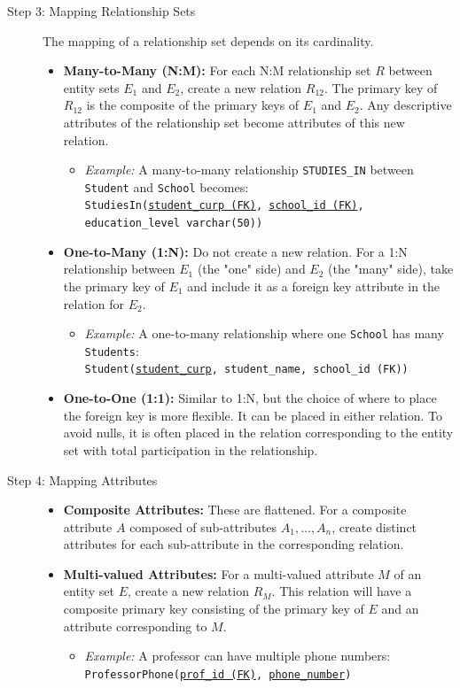 \begin{description}
    \item[Step 3: Mapping Relationship Sets] The mapping of a relationship set depends on its cardinality.
    \begin{itemize}
        \item \textbf{Many-to-Many (N:M):} For each N:M relationship set $R$ between entity sets $E_1$ and $E_2$, create a new relation $R_{12}$. The primary key of $R_{12}$ is the composite of the primary keys of $E_1$ and $E_2$. Any descriptive attributes of the relationship set become attributes of this new relation.
        \begin{itemize}
        \item \textit{Example:} A many-to-many relationship \texttt{STUDIES\_IN} between \texttt{Student} and \texttt{School} becomes: \\
        \texttt{StudiesIn(\underline{student\_curp (FK)}, \underline{school\_id (FK)}, education\_level varchar(50))}
        \end{itemize}
        \item \textbf{One-to-Many (1:N):} Do not create a new relation. For a 1:N relationship between $E_1$ (the "one" side) and $E_2$ (the "many" side), take the primary key of $E_1$ and include it as a foreign key attribute in the relation for $E_2$.
        \begin{itemize}
        \item \textit{Example:} A one-to-many relationship where one \texttt{School} has many \texttt{Students}: \\
        \texttt{Student(\underline{student\_curp}, student\_name, school\_id (FK))}
        \end{itemize}
        \item \textbf{One-to-One (1:1):} Similar to 1:N, but the choice of where to place the foreign key is more flexible. It can be placed in either relation. To avoid nulls, it is often placed in the relation corresponding to the entity set with total participation in the relationship.
    \end{itemize}

    \item[Step 4: Mapping Attributes]
    \begin{itemize}
    \textit{ }
        \item \textbf{Composite Attributes:} These are flattened. For a composite attribute $A$ composed of sub-attributes $A_1, \dots, A_n$, create distinct attributes for each sub-attribute in the corresponding relation.
        \item \textbf{Multi-valued Attributes:} For a multi-valued attribute $M$ of an entity set $E$, create a new relation $R_M$. This relation will have a composite primary key consisting of the primary key of $E$ and an attribute corresponding to $M$.
        \begin{itemize}
        \item \textit{Example:} A professor can have multiple phone numbers: \\
        \texttt{ProfessorPhone(\underline{prof\_id (FK)}, \underline{phone\_number})}
        \end{itemize}
    \end{itemize}
\end{description}
